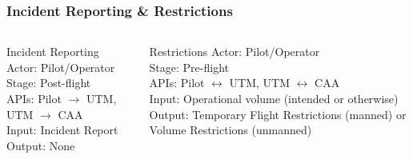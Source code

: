 \documentclass[usenames,dvipsnames,aspectratio=169,serif]{beamer}
\begin{document}
\begin{frame}
   \frametitle{Incident Reporting \& Restrictions}
   \begin{columns}[t]
      \begin{column}{0.5\textwidth}
         \begin{block}{Incident Reporting}
         Actor: Pilot/Operator \\
         Stage: Post-flight \\
         APIs: Pilot $\rightarrow$ UTM, UTM $\rightarrow$ CAA \\
         Input: Incident Report\\
         Output: None \\
         \end{block}
      \end{column}
      \begin{column}{0.5\textwidth}
         \begin{block}{Restrictions}
         Actor: Pilot/Operator \\
         Stage: Pre-flight \\
         APIs: Pilot $\leftrightarrow$ UTM, UTM $\leftrightarrow$ CAA \\
         Input: Operational volume (intended or otherwise)\\
         Output: Temporary Flight Restrictions (manned) or Volume Restrictions (unmanned)
         \end{block}
      \end{column}
   \end{columns}
\end{frame}
\end{document}
